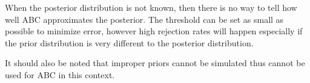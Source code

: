 \documentclass[a4paper,10pt]{article}
\begin{document}
When the posterior distribution is not known, then there is no way to tell how well ABC approximates the posterior. The threshold can be set as small as possible to minimize error, however high rejection rates will happen especially if the prior distribution is very different to the posterior distribution.

It should also be noted that improper priors cannot be simulated thus cannot be used for ABC in this context.




\end{document}
